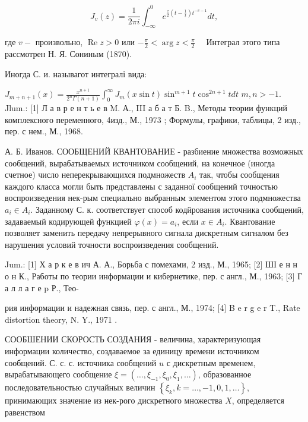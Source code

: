 \documentclass[10pt]{article}
\begin{document}
\[

J_{v}(z)=\frac{1}{2 \pi i} \int_{-\infty}^{0} e^{\frac{z}{2}\left(t-\frac{1}{t}\right) t^{-v-1}} d t,

\]



где $v-$ произвольно, $\operatorname{Re} z>0$ или $-\frac{\pi}{2}<\arg z<\frac{\pi}{2} \quad$ Интеграл этого типа рассмотрен Н. Я. Сониным (1870).



Иногда С. и. называгот интегралі вида:



$J_{m+n+1}(x)=\frac{x^{n+1}}{2^{n} \Gamma(n+1)} \int_{0}^{\infty} J_{m}(x \sin t) \sin ^{m+1} t \cos ^{2 n+1} t d t$ $m, n>-1$. Jlum.: [1] Л а в р е н т ь е в M. А., III а б а т Б. B., Методы теории функций комплексного переменного, 4изд., М., 1973 ; Формулы, графики, таблицы, 2 изд., пер. с нем., М., 1968.



А. Б. Иванов. СООБЩЕНИЙ КВАНТОВАНИЕ - разбиение множества возможных сообщений, вырабатываемых источником сообщений, на конечное (иногда счетное) число неперекрывающихся подмножеств $A_{i}$ так, чтобы сообщения каждого класса могли быть представлены с заданної сообщений точностью воспроизведения нек-рым специально выбранным элементом этого подмножества $a_{i} \in A_{i}$. Заданному С. к. соответствует способ кодйрования источника сообщений, задаваемый кодирующей функцией $\varphi(x)=a_{i}$, если $x \in A_{i}$. Квантование позволяет заменить передачу непрерывного сигнала дискретным сигналом без нарушения условий точности воспроизведения сообщений.



Jum.: [1] Х а р к е в ич А. А., Борьба с помехами, 2 изд., М., 1965; [2] ШІ е н н о н К., Работы по теории информации и кибернетике, пер. с англ., М., 1963; [3] Г а л л а г е p Р., Тео-

рия информации и надежная связь, пер. с англ., М., 1974; [4] B e r g e r T., Rate distortion theory, N. Y., 1971 .



СООБШЕНИИ СКОРОСТЬ СОЗДАНИЯ - величина, характеризующая информации количество, создаваемое за единицу времени источником сообщений. С. с. с. источника сообщений $u$ с дискретным временем, вырабатывающего сообщение $\xi=\left(\ldots, \xi_{-1}, \xi_{0}, \xi_{1}, \ldots\right)$, образованное последовательностью случайных величин $\left\{\xi_{k}, k=\ldots,-1,0,1, \ldots\right\}$, принимающих значение из нек-рого дискретного множества $X$, определяется равенством
\end{document}
